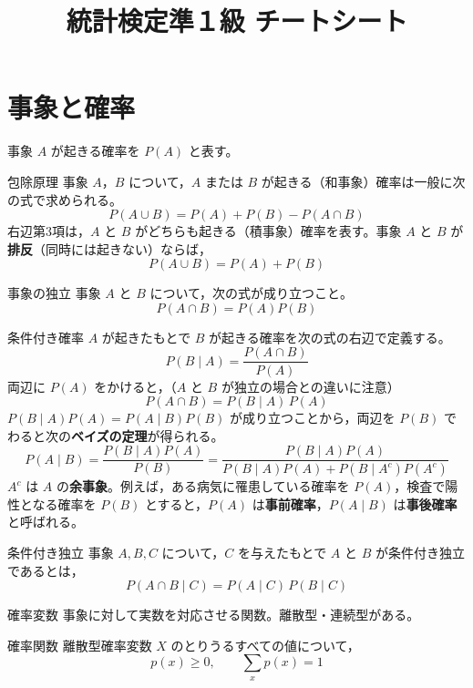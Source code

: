 \documentclass[a4paper,11pt]{ltjsarticle}
\title{統計検定準１級 チートシート}
\author{}
\date{}
\begin{document}
\maketitle

\tableofcontents
\newpage

\section{事象と確率}

事象 $A$ が起きる確率を $P(A)$ と表す。

\begin{term}{包除原理}
事象 $A$，$B$ について，$A$ または $B$ が起きる（和事象）確率は一般に次の式で求められる。
\[
P(A \cup B) = P(A) + P(B) - P(A \cap B)
\]
右辺第3項は，$A$ と $B$ がどちらも起きる（積事象）確率を表す。事象 $A$ と $B$ が\textbf{排反}（同時には起きない）ならば，
\[
P(A \cup B) = P(A) + P(B)
\]
\end{term}

\begin{term}{事象の独立}
事象 $A$ と $B$ について，次の式が成り立つこと。
\[
P(A \cap B) = P(A)P(B)
\]
\end{term}

\begin{term}{条件付き確率}
$A$ が起きたもとで $B$ が起きる確率を次の式の右辺で定義する。
\[
P(B \mid A) = \frac{P(A \cap B)}{P(A)}
\]
両辺に $P(A)$ をかけると，（$A$ と $B$ が独立の場合との違いに注意）
\[
P(A \cap B) = P(B \mid A)\,P(A)
\]
$P(B\mid A)P(A) = P(A\mid B)P(B)$ が成り立つことから，両辺を $P(B)$ でわると次の\textbf{ベイズの定理}が得られる。
\[
P(A \mid B) = \frac{P(B \mid A)P(A)}{P(B)}
= \frac{P(B\mid A)P(A)}{P(B\mid A)P(A) + P(B\mid A^c)P(A^c)}
\]
$A^c$ は $A$ の\textbf{余事象}。例えば，ある病気に罹患している確率を $P(A)$，検査で陽性となる確率を $P(B)$ とすると，$P(A)$ は\textbf{事前確率}，$P(A\mid B)$ は\textbf{事後確率}と呼ばれる。
\end{term}

\begin{term}{条件付き独立}
事象 $A,B,C$ について，$C$ を与えたもとで $A$ と $B$ が条件付き独立であるとは，
\[
P(A \cap B \mid C) = P(A\mid C)\,P(B\mid C)
\]
\end{term}

\begin{term}{確率変数}
事象に対して実数を対応させる関数。離散型・連続型がある。
\end{term}

\begin{term}{確率関数}
離散型確率変数 $X$ のとりうるすべての値について，
\[
p(x) \ge 0, \qquad \sum_x p(x) = 1
\]
\end{term}
\end{document}
